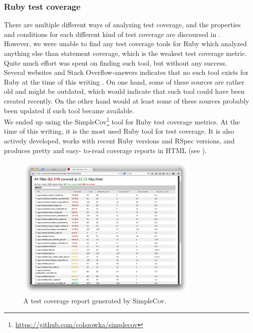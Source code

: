 \label{sec:coverage_frameworks}

\subsubsection{Ruby test coverage}
There are multiple different ways of analyzing test coverage, and the
properties and conditions for each different kind of test coverage are
discoursed in . However, we were unable to find any
test coverage tools for Ruby which analyzed anything else than statement
coverage, which is the weakest test coverage metric. Quite much effort
was spent on finding such tool, but without any success. Several
websites and Stack Overflow-answers indicates that no such tool exists
for Ruby at the time of this writing \cite{web:coverage_ruby19,
so:c1c2_coverage, so:c1_coverage, web:toolbox_code_metrics}. On one
hand, some of these sources are rather old and might be outdated, which
would indicate that such tool could have been created recently. On the
other hand would at least some of these sources probably been updated if
such tool became available.\\

We ended up using the
SimpleCov\footnote{\url{https://github.com/colszowka/simplecov}} tool
for Ruby test coverage metrics. At the time of this writing, it is the
most used Ruby tool for test coverage. It is also actively developed,
works with recent Ruby versions and RSpec versions, and produces pretty
and easy- to-read coverage reports in HTML (see
).\cite{web:toolbox_code_metrics}\\

\begin{figure}
\centering
\includegraphics[width=0.8\textwidth]{results/choices/simplecov}
\caption{A test coverage report generated by SimpleCov.}
\label{fig:simplecov_report}
\end{figure}


